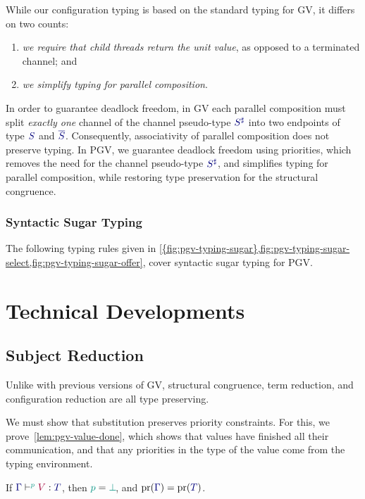 While our configuration typing is based on the standard typing for GV, it differs on two counts:
\begin{enumerate}[label= (\roman*) ]
  \item \emph{we require that child threads return the unit value}, as opposed to a terminated channel; and
  \item \emph{we simplify typing for parallel composition}.
\end{enumerate}

In order to guarantee deadlock freedom, in GV each parallel composition must split \emph{exactly one} channel of the channel pseudo-type $\ty{S^\sharp}$ into two endpoints of type $\ty{S}$ and $\ty{\co{S}}$. Consequently, associativity of parallel composition does not preserve typing. In PGV, we guarantee deadlock freedom using priorities, which removes the need for the channel pseudo-type $\ty{S^\sharp}$, and simplifies typing for parallel composition, while restoring type preservation for the structural congruence.

\subsubsection*{Syntactic Sugar Typing}

The following typing rules given in \cref{{fig:pgv-typing-sugar},fig:pgv-typing-sugar-select,fig:pgv-typing-sugar-offer}, cover syntactic sugar typing for PGV.

\section{Technical Developments}
\subsection{Subject Reduction}
Unlike with previous versions of GV, structural congruence, term reduction, and configuration reduction are all type preserving.

We must show that substitution preserves priority constraints. For this, we prove~\cref{lem:pgv-value-done}, which shows that values have finished all their communication, and that any priorities in the type of the value come from the typing environment.
\begin{lem}\label{lem:pgv-value-done}
  If $\tseq[\cs{p}]{\ty{\Gamma}}{V}{T}$, then $\cs{p}=\cs{\pbot}$, and $\minpr(\ty{\Gamma})=\minpr(\ty{T})$.
\end{lem}


